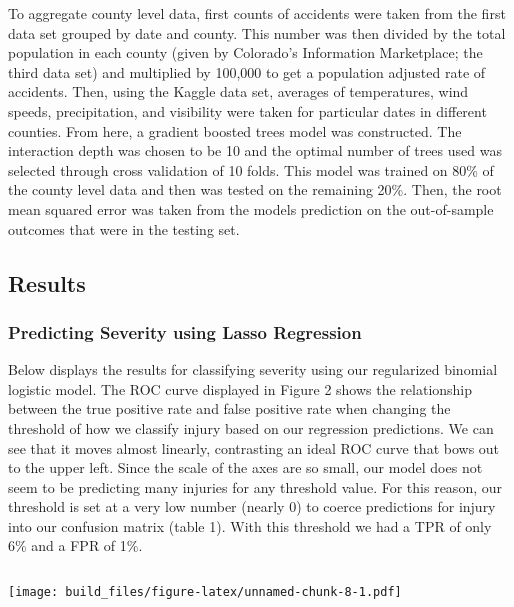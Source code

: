 \documentclass[
]{article}
\begin{document}
To aggregate county level data, first counts of accidents were taken
from the first data set grouped by date and county. This number was then
divided by the total population in each county (given by Colorado's
Information Marketplace; the third data set) and multiplied by 100,000
to get a population adjusted rate of accidents. Then, using the Kaggle
data set, averages of temperatures, wind speeds, precipitation, and
visibility were taken for particular dates in different counties. From
here, a gradient boosted trees model was constructed. The interaction
depth was chosen to be 10 and the optimal number of trees used was
selected through cross validation of 10 folds. This model was trained on
80\% of the county level data and then was tested on the remaining 20\%.
Then, the root mean squared error was taken from the models prediction
on the out-of-sample outcomes that were in the testing set.

\hypertarget{results}{%
\subsection{Results}\label{results}}

\hypertarget{predicting-severity-using-lasso-regression}{%
\subsubsection{Predicting Severity using Lasso
Regression}\label{predicting-severity-using-lasso-regression}}

Below displays the results for classifying severity using our
regularized binomial logistic model. The ROC curve displayed in Figure 2
shows the relationship between the true positive rate and false positive
rate when changing the threshold of how we classify injury based on our
regression predictions. We can see that it moves almost linearly,
contrasting an ideal ROC curve that bows out to the upper left. Since
the scale of the axes are so small, our model does not seem to be
predicting many injuries for any threshold value. For this reason, our
threshold is set at a very low number (nearly 0) to coerce predictions
for injury into our confusion matrix (table 1). With this threshold we
had a TPR of only 6\% and a FPR of 1\%.

\begin{verbatim}
\end{verbatim}

\texttt{[image: build\_files/figure-latex/unnamed-chunk-8-1.pdf]}
\end{document}

